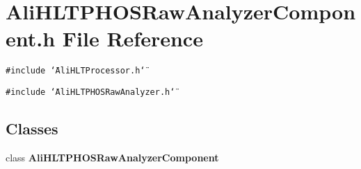 \section{Ali\-HLTPHOSRaw\-Analyzer\-Component.h File Reference}
\label{AliHLTPHOSRawAnalyzerComponent_8h}


{\tt \#include \char`\"{}Ali\-HLTProcessor.h\char`\"{}}\par
{\tt \#include \char`\"{}Ali\-HLTPHOSRaw\-Analyzer.h\char`\"{}}\par
\subsection*{Classes}
\begin{CompactItemize}
\item 
class {\bf Ali\-HLTPHOSRaw\-Analyzer\-Component}
\end{CompactItemize}
